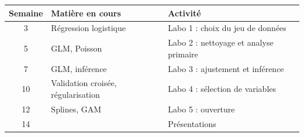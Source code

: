 \documentclass[11pt,letterpaper]{scrartcl}
\begin{document}
\begin{center}
\begin{tabular}{@{}cll@{}}
\toprule
Semaine & Matière en cours & Activité \\
\midrule
3  & Régression logistique & Labo 1 : choix du jeu de données \\
5  & GLM, Poisson & Labo 2 : nettoyage et analyse primaire \\
7  & GLM, inférence & Labo 3 : ajustement et inférence \\
10 & Validation croisée, régularisation & Labo 4 : sélection de variables \\
12 & Splines, GAM & Labo 5 : ouverture \\
14 & & Présentations \\
\bottomrule
\end{tabular}
\end{center}
\end{document}
